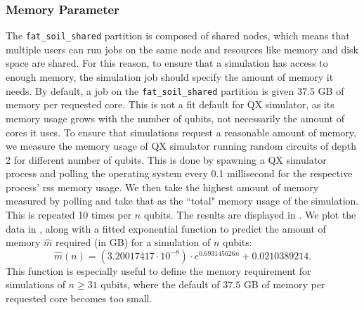 \clearpage

\subsubsection{Memory Parameter}
The \texttt{fat_soil_shared} partition is composed of shared nodes, which means that multiple users can run jobs on the same node and resources like memory and disk space are shared.
For this reason, to ensure that a simulation has access to enough memory, the simulation job should specify the amount of memory it needs.
By default, a job on the \texttt{fat_soil_shared} partition is given $37.5$ GB of memory per requested core.
This is not a fit default for QX simulator, as its memory usage grows with the number of qubits, not necessarily the amount of cores it uses.
To ensure that simulations request a reasonable amount of memory, we measure the memory usage of QX simulator running random circuits of depth 2 for different number of qubits.
This is done by spawning a QX simulator process and polling the operating system every 0.1 millisecond for the respective process' \gls{rss} memory usage.
We then take the highest amount of memory measured by polling and take that as the ``total" memory usage of the simulation.
This is repeated 10 times per $n$ qubits.
The results are displayed in .
We plot the data in , along with a fitted exponential function to predict the amount of memory $\hat{m}$ required (in GB) for a simulation of $n$ qubits:
\begin{equation}
\hat{m}(n) = \left(3.20017417 \cdot 10^{-8}\right) \cdot e^{0.693145626n} + 0.0210389214.
\end{equation}
This function is especially useful to define the memory requirement for simulations of $n \ge 31$ qubits, where the default of $37.5$ GB of memory per requested core becomes too small.

